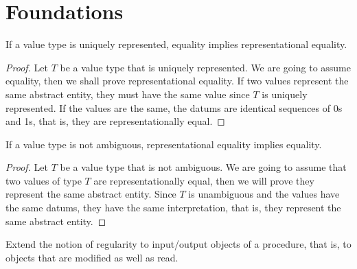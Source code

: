 
\chapter{Foundations}

\begin{lemma}
	If a value type is uniquely represented, equality implies representational equality.
\end{lemma}

\begin{proof}
	Let $T$ be a value type that is uniquely represented. We are going to assume equality,
	then we shall prove representational equality. If two values represent the same abstract entity,
	they must have the same value since $T$ is uniquely represented. If the values are the same, the datums
	are identical sequences of 0s and 1s, that is, they are representationally equal.
\end{proof}

\begin{lemma}
	If a value type is not ambiguous, representational equality implies equality.
\end{lemma}

\begin{proof}
	Let $T$ be a value type that is not ambiguous. We are going to assume that two values of type $T$ are
	representationally equal, then we will prove they represent the same abstract entity. Since $T$ is
	unambiguous and the values have the same datums, they have the same interpretation, that is, they
	represent the same abstract entity.
\end{proof}

\begin{exercise}
	Extend the notion of regularity to input/output objects of a procedure, that is, to objects that are
	modified as well as read.
\end{exercise}
